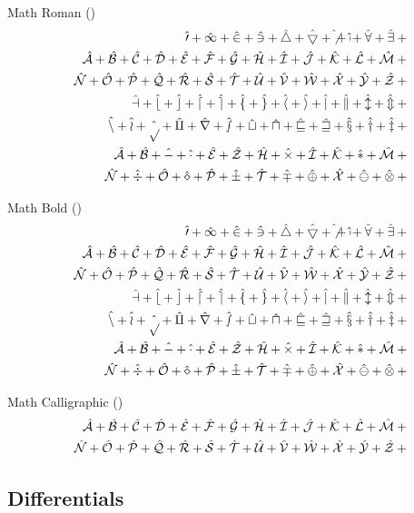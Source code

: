\documentclass[12pt, a4paper, oneside]{article}
\theoremstyle{Plain}
\theoremstyle{Definition}
\theoremstyle{Remark}
\begin{document}
\begin{appendix}
Math Roman (\texttt{\string\mathrm})
\def\test#1{\hat{\mathrm{#1}}+{}}%
\begin{eqnarray*}
  && {\testnums}\\
  && {\testupperi}\\
  && {\testupperii}\\
  && {\testloweri}\\
  && {\testlowerii}\\
  && {\testupgreeki}\\
  && {\testupgreekii}
\end{eqnarray*}%


Math Bold (\texttt{\string\mathbf})
\def\test#1{\hat{\mathbf{#1}}+{}}%
\begin{eqnarray*}
  && {\testnums}\\
  && {\testupperi}\\
  && {\testupperii}\\
  && {\testloweri}\\
  && {\testlowerii}\\
  && {\testupgreeki}\\
  && {\testupgreekii}
\end{eqnarray*}

Math Calligraphic (\texttt{\string\mathcal})
\def\test#1{\hat{\mathcal{#1}}+{}}%
\begin{eqnarray*}
  && {\testupperi}\\
  && {\testupperii}
\end{eqnarray*}%


\subsection{Differentials \showfamily}


\end{appendix}
\end{document}
